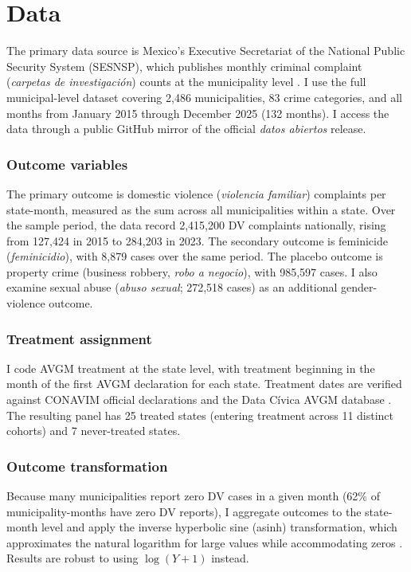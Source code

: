 \documentclass[12pt]{article}
\begin{document}
\section{Data}

The primary data source is Mexico's Executive Secretariat of the National Public Security System (SESNSP), which publishes monthly criminal complaint (\textit{carpetas de investigaci\'on}) counts at the municipality level \citep{sesnsp2025}. I use the full municipal-level dataset covering 2,486 municipalities, 83 crime categories, and all months from January 2015 through December 2025 (132 months). I access the data through a public GitHub mirror of the official \textit{datos abiertos} release.

\subsubsection*{Outcome variables} The primary outcome is domestic violence (\textit{violencia familiar}) complaints per state-month, measured as the sum across all municipalities within a state. Over the sample period, the data record 2,415,200 DV complaints nationally, rising from 127,424 in 2015 to 284,203 in 2023. The secondary outcome is feminicide (\textit{feminicidio}), with 8,879 cases over the same period. The placebo outcome is property crime (business robbery, \textit{robo a negocio}), with 985,597 cases. I also examine sexual abuse (\textit{abuso sexual}; 272,518 cases) as an additional gender-violence outcome.

\subsubsection*{Treatment assignment} I code AVGM treatment at the state level, with treatment beginning in the month of the first AVGM declaration for each state. Treatment dates are verified against CONAVIM official declarations and the Data C\'ivica AVGM database \citep{data_civica_2020}. The resulting panel has 25 treated states (entering treatment across 11 distinct cohorts) and 7 never-treated states.

\subsubsection*{Outcome transformation} Because many municipalities report zero DV cases in a given month (62\% of municipality-months have zero DV reports), I aggregate outcomes to the state-month level and apply the inverse hyperbolic sine (asinh) transformation, which approximates the natural logarithm for large values while accommodating zeros \citep{bellemare_wichman2020}. Results are robust to using $\log(Y + 1)$ instead.
\end{document}
